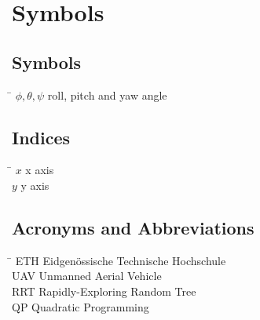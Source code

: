 \chapter*{Symbols}\label{chap:symbole}

\section*{Symbols}
\begin{tabbing}
 \hspace*{3cm} \= \kill
  $\phi, \theta, \psi$ 		\> roll, pitch and yaw angle \\[0.5ex] 							
 \end{tabbing}

\section*{Indices}
\begin{tabbing}
 \hspace*{1.6cm}  \= \kill
 $x$ \> x axis \\[0.5ex]
 $y$ \> y axis \\[0.5ex]
 
\end{tabbing}

\section*{Acronyms and Abbreviations}
\begin{tabbing}
 \hspace*{1.6cm}  \= \kill
 ETH \> Eidgen\"{o}ssische Technische Hochschule \\[0.5ex]
 UAV \> Unmanned Aerial Vehicle \\[0.5ex]
RRT \> Rapidly-Exploring Random Tree\\[0.5ex]
QP \>  Quadratic Programming\\[0.5ex]
\end{tabbing}

 \cleardoublepage

